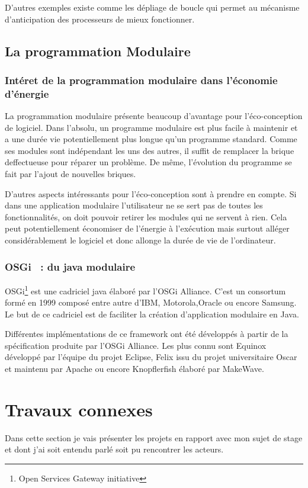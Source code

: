 \documentclass[a4paper, 11pt]{report}
\begin{document}
D'autres exemples existe comme les dépliage de boucle\cite{EcoLogiciels} qui permet au mécanisme d'anticipation des processeurs de mieux fonctionner.

		\subsection{La programmation Modulaire}
			\subsubsection{Intéret de la programmation modulaire dans l'économie d'énergie}
La programmation modulaire présente beaucoup d'avantage pour l'éco-conception de logiciel. Dans l'absolu, un programme modulaire est plus facile à maintenir et a une durée vie potentiellement plus longue qu'un programme standard. Comme ses modules sont indépendant les uns des autres, il suffit de remplacer la brique deffectueuse pour réparer un problème. De même, l'évolution du programme se fait par l'ajout de nouvelles briques.

D'autres aspects intéressants pour l'éco-conception sont à prendre en compte. Si dans une application modulaire l'utilisateur ne se sert pas de toutes les fonctionnalités, on doit pouvoir retirer les modules qui ne servent à rien. Cela peut potentiellement économiser de l'énergie à l'exécution mais surtout alléger considérablement le logiciel et donc allonge la durée de vie de l'ordinateur.

			\subsubsection{OSGi ~: du java modulaire}
OSGi\footnote{Open Services Gateway initiative} est une cadriciel java élaboré par l'OSGi Alliance. C'est un consortum formé en 1999 composé entre autre d'IBM, Motorola,Oracle ou encore Samsung. Le but de ce cadriciel est de faciliter la création d'application modulaire en Java. 

Différentes implémentations de ce framework ont été développés à partir de la spécification produite par l'OSGi Alliance. Les plus connu sont Equinox développé par l’équipe du projet Eclipse, Felix issu du projet universitaire Oscar et maintenu par Apache ou encore Knopflerfish élaboré par MakeWave.
		
	\section{Travaux connexes}
Dans cette section je vais présenter les projets en rapport avec mon sujet de stage et dont j'ai soit entendu parlé soit pu rencontrer les acteurs.
\end{document}
